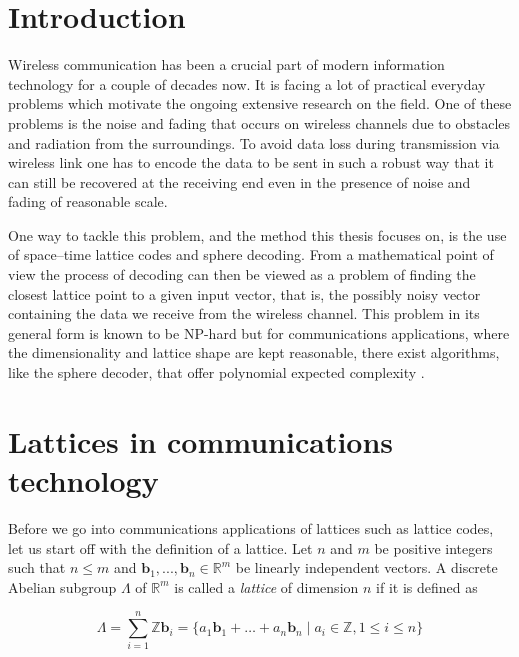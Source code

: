 \documentclass[english,12pt,a4paper,pdftex,sci,utf8]{aaltothesis}
\begin{document}
\section{Introduction}
Wireless communication has been a crucial part of modern information technology for a couple of decades now. It is facing a lot of practical everyday problems which motivate the ongoing extensive research on the field. One of these problems is the noise and fading that occurs on wireless channels due to obstacles and radiation from the surroundings. To avoid data loss during transmission via wireless link one has to encode the data to be sent in such a robust way that it can still be recovered at the receiving end even in the presence of noise and fading of reasonable scale. 
\par One way to tackle this problem, and the method this thesis focuses on, is the use of space--time lattice codes and sphere decoding. From a mathematical point of view the process of decoding can then be viewed as a problem of finding the closest lattice point to a given input vector, that is, the possibly noisy vector containing the data we receive from the wireless channel. This problem in its general form is known to be NP-hard but for communications applications, where the dimensionality and lattice shape are kept reasonable, there exist algorithms, like the sphere decoder, that offer polynomial expected complexity \cite{mia}.


\clearpage

\section{Lattices in communications technology}

Before we go into communications applications of lattices such as lattice codes, let us start off with the definition of a lattice. Let $n$ and $m$ be positive integers such that $n \leq m$ and $\mathbf{b}_1, ... , \mathbf{b}_n \in \mathbb{R}^m$ be linearly independent vectors. A discrete Abelian subgroup $\Lambda$ of $\mathbb{R}^m$ is called a \emph{lattice} of dimension $n$ if it is defined as

\begin{equation}
\Lambda = \sum_{i=1}^{n} \mathbb{Z}\mathbf{b}_i = \{a_1\mathbf{b}_1 + \ldots + a_n\mathbf{b}_n \mid a_i \in \mathbb{Z}, 1 \leq i \leq n\}\label{eq:lattice}
\end{equation}
\end{document}
